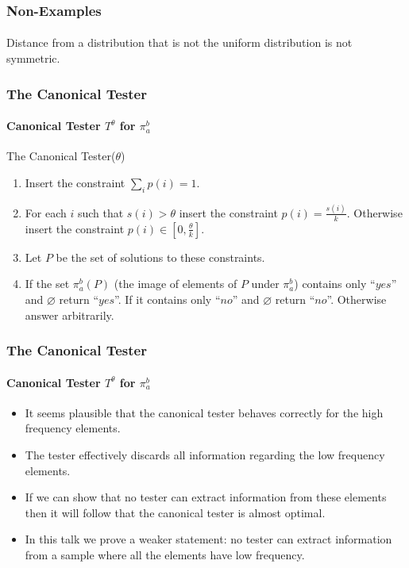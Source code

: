 \documentclass{beamer}
\begin{document}
\begin{frame}
  \frametitle{Non-Examples} \framesubtitle{}
  \begin{block}{}
    Distance from a distribution that is not the uniform distribution
    is not symmetric.
  \end{block}
\end{frame}


\begin{frame}
  \frametitle{The Canonical Tester} \framesubtitle{Canonical Tester
    $T^\theta$ for $\pi_a^b$}
  \begin{block}{The Canonical Tester($\theta$)}
    \begin{enumerate}
    \item<2-> Insert the constraint $\sum_ip(i)=1$.
    \item<3-> For each $i$ such that $s(i)>\theta$ insert the constraint
      $p(i)=\frac{s(i)}{k}$. Otherwise insert the constraint $p(i)\in
      [0,\frac{\theta}{k}]$.
    \item<4-> Let $P$ be the set of solutions to these constraints.
    \item<5-> If the set $\pi_a^b(P)$ (the image of elements of $P$
      under $\pi_a^b$) contains only ``$yes$'' and $\varnothing$ return
      ``$yes$''. If it contains only ``$no$'' and $\varnothing$ return
      ``$no$''. Otherwise answer arbitrarily.
    \end{enumerate}
  \end{block}
\end{frame}
\begin{frame}
  \frametitle{The Canonical Tester} \framesubtitle{Canonical Tester
    $T^\theta$ for $\pi_a^b$}
  \begin{block}{}
    \begin{itemize}
    \item<1-> It seems plausible that the canonical tester behaves
      correctly for the high frequency elements.
    \item<2-> The tester effectively discards all information
      regarding the low frequency elements.
    \item<3-> If we can show that no tester can extract information from
      these elements then it will follow that the canonical tester is
      almost optimal.
    \item<4-> In this talk we prove a weaker statement: no tester can
      extract information from a sample where all the elements have
      low frequency.
    \end{itemize}
  \end{block}
\end{frame}
\end{document}
